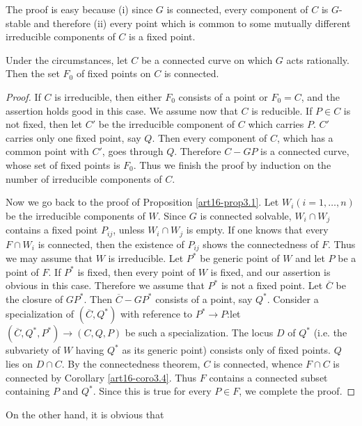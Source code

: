 The proof is easy because (i) since $G$ is connected, every component of $C$ is $G$-stable and therefore (ii) every point which is common to some mutually different irreducible components of $C$ is a fixed point.

\begin{corollary}\label{art16-coro3.4}
Under the circumstances, let $C$ be a connected curve on which $G$ acts rationally. Then the set $F_{0}$ of fixed points on $C$ is connected.
\end{corollary}

\begin{proof}
If $C$ is irreducible, then either $F_{0}$ consists of a point or $F_{0}=C$, and the assertion holds good in this case. We assume now that $C$ is reducible. If $P\in C$ is not fixed, then let $C'$ be the irreducible component of $C$ which carries $P$. $C'$ carries only one fixed point, say $Q$. Then every component of $C$, which has a common point with $C'$, goes through $Q$. Therefore $C-GP$ is a connected curve, whose set of fixed points is $F_{0}$. Thus we finish the proof by induction on the number of irreducible components of $C$.

Now we go back to the proof of Proposition \ref{art16-prop3.1}. Let $W_{i}(i=1,\ldots,n)$ be the irreducible components of $W$. Since $G$ is connected solvable, $W_{i}\cap W_{j}$ contains a fixed point $P_{ij}$, unless $W_{i}\cap W_{j}$ is empty. If one knows that every $F\cap W_{i}$ is connected, then the existence of $P_{ij}$ shows the connectedness of $F$. Thus we may assume that $W$ is irreducible. Let $P^{*}$ be generic point of $W$ and let $P$ be a point of $F$. If $P^{*}$ is fixed, then every point of $W$ is fixed, and our assertion is obvious in this case. Therefore we assume that $P^{*}$ is not a fixed point. Let $\overline{C}$ be the closure of $GP^{*}$. Then $\overline{C}-GP^{*}$ consists of a point, say $Q^{*}$. Consider a specialization of $(\overline{C},Q^{*})$ with reference to $P^{*}\to P$:\pageoriginale let $(\overline{C},Q^{*},P^{*})\to (C,Q,P)$ be such a specialization. The locus $D$ of $Q^{*}$ (i.e. the subvariety of $W$ having $Q^{*}$ as its generic point) consists only of fixed points. $Q$ lies on $D\cap C$. By the connectedness theorem, $C$ is connected, whence $F\cap C$ is connected by Corollary \ref{art16-coro3.4}. Thus $F$ contains a connected subset containing $P$ and $Q^{*}$. Since this is true for every $P\in F$, we complete the proof.
\end{proof}

On the other hand, it is obvious that

